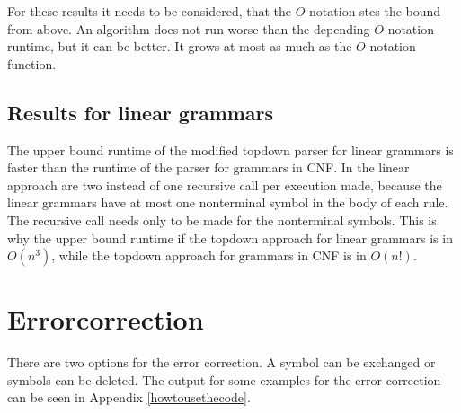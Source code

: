 \documentclass[a4paper, 11pt]{article}
\begin{document}
For these results it needs to be considered, that the $O$-notation stes the bound from above. An algorithm does not run worse than the depending $O$-notation runtime, but it can be better. It grows at most as much as the $O$-notation function. \cite{bigO}

\subsection{Results for linear grammars}
\label{results_linear}

The upper bound runtime of the modified topdown parser for linear grammars is faster than the runtime of the parser for grammars in CNF. In the linear approach are two instead of one recursive call per execution made, because the linear grammars have at most one nonterminal symbol in the body of each rule. The recursive call needs only to be made for the nonterminal symbols. 
This is why the upper bound runtime if the topdown approach for linear grammars is in $O(n^3)$, while the topdown approach for grammars in CNF is in $O(n!)$.










\pagebreak










\section{Errorcorrection}
\label{errorcorrection}

There are two options for the error correction. A symbol can be exchanged or symbols can be deleted. The output for some examples for the error correction can be seen in Appendix \ref{howtousethecode}.





\end{document}

